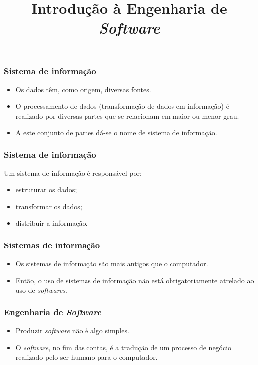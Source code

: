 \documentclass[11pt]{beamer}
\title{Introdução à Engenharia de \textit{Software}}
\author{}
\date{}
\begin{document}
    \begin{frame}[plain]
        \titlepage
    \end{frame}

    \begin{frame}
      \frametitle{Sistema de informação}
      \begin{itemize}
        \item Os dados têm, como origem, diversas fontes.
        \item O processamento de dados (transformação de dados em informação) é realizado por diversas partes que se relacionam em maior ou menor grau.
        \item A este conjunto de partes dá-se o nome de sistema de informação.
      \end{itemize}
    \end{frame}

    \begin{frame}
      \frametitle{Sistema de informação}
      Um sistema de informação é responsável por:
      \begin{itemize}
        \item estruturar os dados;
        \item transformar os dados;
        \item distribuir a informação.
      \end{itemize}
    \end{frame}

    \begin{frame}
      \frametitle{Sistemas de informação}
      \begin{itemize}
        \item Os sistemas de informação são mais antigos que o computador.
        \item Então, o uso de sistemas de informação não está obrigatoriamente atrelado ao uso de \textit{softwares}.
      \end{itemize}
    \end{frame}

    \begin{frame}
      \frametitle{Engenharia de \textit{Software}}
      \begin{itemize}
        \item Produzir \textit{software} não é algo simples.
        \item O \textit{software}, no fim das contas, é a tradução de um processo de negócio realizado pelo ser humano para o computador.
      \end{itemize}
    \end{frame}
    
\end{document}

